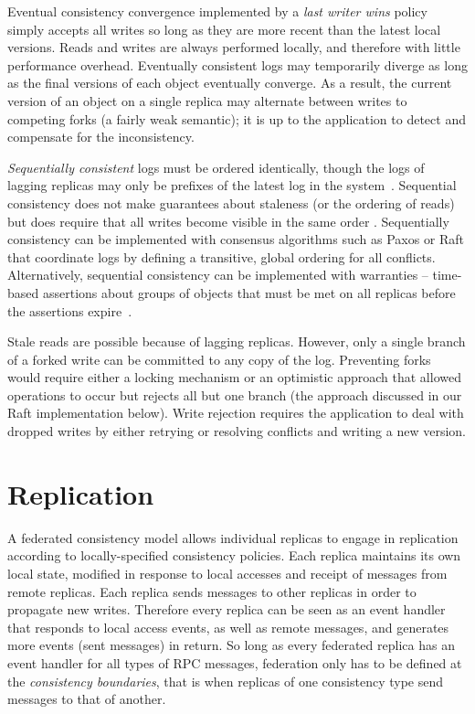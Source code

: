 \documentclass[10pt,conference,letterpaper]{IEEEtran}
\begin{document}
Eventual consistency convergence implemented by a \textit{last writer wins} policy simply accepts all
writes so long as they are more recent than the latest local versions.
Reads and writes are always performed locally, and therefore with little
performance overhead.
Eventually consistent logs may temporarily diverge as long as the final versions of each
object eventually converge.
As a result, the current version of an object on a single replica may alternate between writes to competing
forks (a fairly weak semantic); it is up to the application to detect and compensate for the
inconsistency.

\emph{Sequentially consistent} logs must be ordered identically, though the logs of
lagging replicas may only be prefixes of the latest log in the system~\cite{attiya_sequential_1994}.
Sequential consistency does not make guarantees about staleness
(or the ordering of reads) but does require that all writes become visible in the same
order \cite{bermbach_consistency_2013}.
Sequentially consistency can be implemented with consensus algorithms such as Paxos
\cite{lamport_fast_2006} or Raft \cite{ongaro_search_2014} that coordinate logs by
defining a transitive, global ordering for all conflicts.
Alternatively, sequential consistency can be implemented with warranties -- time-based
assertions about groups of objects that must be met on all replicas before the assertions
expire~\cite{liu_warranties_2014}.

Stale reads are possible because of lagging replicas.
However, only a single branch of a forked write can be committed to any copy of the log.
Preventing forks would require either a locking mechanism or an optimistic approach that
allowed operations to occur but rejects all but one branch (the approach discussed in our
Raft implementation below).
Write rejection requires the application to deal with dropped writes by either retrying or
resolving conflicts and writing a new version.

\section{Replication}

A federated consistency model allows individual replicas to
engage in replication according to locally-specified consistency policies.
Each replica maintains its own local state, modified in response to local accesses
and receipt of messages from remote replicas.
Each replica sends messages to other replicas in order to propagate new writes.
Therefore every replica can be seen as an event handler that responds to local access
events, as well as remote messages, and generates more events (sent messages) in return.
So long as every federated replica has an event handler for all types of RPC
messages, federation only has to be defined at the \textit{consistency boundaries}, that
is when replicas of one consistency type send messages to that of another.
\end{document}
